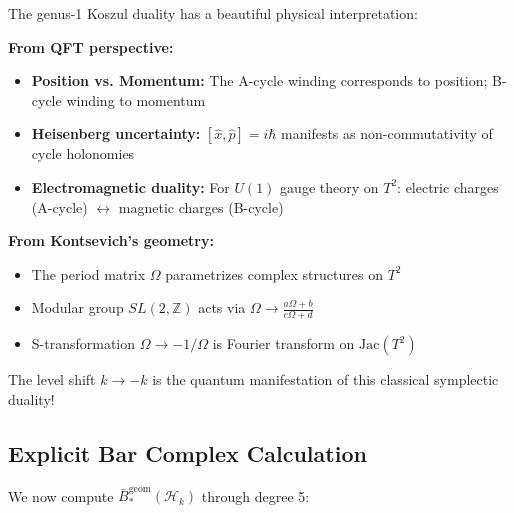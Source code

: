 \begin{remark}\label{rem:heisenberg-physics}
The genus-1 Koszul duality has a beautiful physical interpretation:

\textbf{From QFT perspective:}
\begin{itemize}
\item \textbf{Position vs. Momentum:} The A-cycle winding corresponds to position; B-cycle winding to momentum
\item \textbf{Heisenberg uncertainty:} $[\hat{x}, \hat{p}] = i\hbar$ manifests as non-commutativity of cycle holonomies
\item \textbf{Electromagnetic duality:} For $U(1)$ gauge theory on $T^2$: electric charges (A-cycle) $\leftrightarrow$ magnetic charges (B-cycle)
\end{itemize}

\textbf{From Kontsevich's geometry:}
\begin{itemize}
\item The period matrix $\Omega$ parametrizes complex structures on $T^2$
\item Modular group $SL(2,\mathbb{Z})$ acts via $\Omega \to \frac{a\Omega+b}{c\Omega+d}$
\item S-transformation $\Omega \to -1/\Omega$ is Fourier transform on $\text{Jac}(T^2)$
\end{itemize}

The level shift $k \to -k$ is the quantum manifestation of this classical symplectic duality!
\end{remark}

\subsection{Explicit Bar Complex Calculation}

We now compute $\bar{B}^{\text{geom}}_*(\mathcal{H}_k)$ through degree 5:

